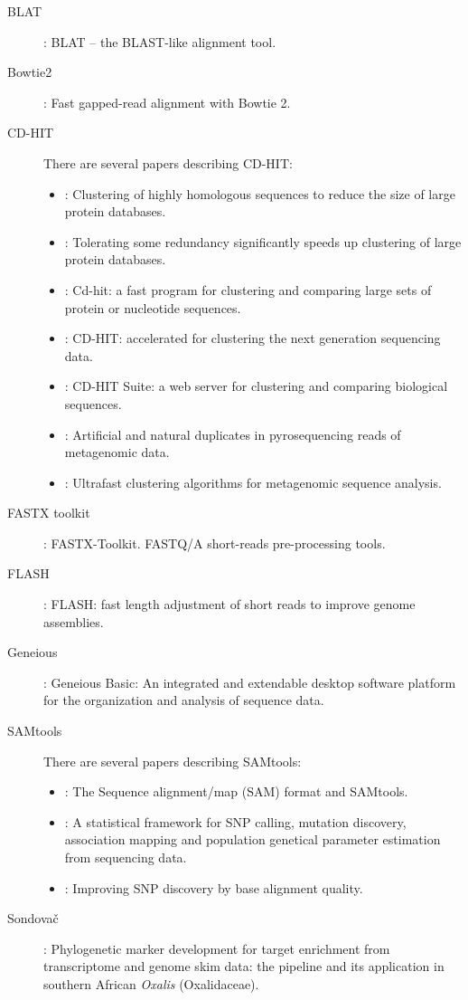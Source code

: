 \documentclass[a4paper, 11pt, twoside]{article}
\begin{document}
\begin{description}
 \item[BLAT] \citet{Kent2002}: BLAT -- the BLAST-like alignment tool.
 \item[Bowtie2] \citet{Langmead2012}: Fast gapped-read alignment with Bowtie 2.
 \item[CD-HIT] There are several papers describing CD-HIT:
  \begin{itemize}
    \item \citet{Li2001}: Clustering of highly homologous sequences to reduce the size of large protein databases.
    \item \citet{Li2002}: Tolerating some redundancy significantly speeds up clustering of large protein databases.
    \item \citet{Li2006}: Cd-hit: a fast program for clustering and comparing large sets of protein or nucleotide sequences.
    \item \citet{Fu2012}: CD-HIT: accelerated for clustering the next generation sequencing data.
    \item \citet{Huang2010}: CD-HIT Suite: a web server for clustering and comparing biological sequences.
    \item \citet{Niu2010}: Artificial and natural duplicates in pyrosequencing reads of metagenomic data.
    \item \citet{Li2012b}: Ultrafast clustering algorithms for metagenomic sequence analysis.
   \end{itemize}
 \item[FASTX toolkit] \citet{Gordon2010}: FASTX-Toolkit. FASTQ/A short-reads pre-processing tools.
 \item[FLASH] \citet{Magoc2011}: FLASH: fast length adjustment of short reads to improve genome assemblies.
 \item[Geneious] \citet{Kearse2012}: Geneious Basic: An integrated and extendable desktop software platform for the organization and analysis of sequence data.
 \item[SAMtools] There are several papers describing SAMtools:
  \begin{itemize}
   \item \citet{Li2009}: The Sequence alignment/map (SAM) format and SAMtools.
   \item \citet{Li2011}: A statistical framework for SNP calling, mutation discovery, association mapping and population genetical parameter estimation from sequencing data.
   \item \citet{Li2011a}: Improving SNP discovery by base alignment quality.
  \end{itemize}
 \item[Sondovač] \citet{Schmickl2016}: Phylogenetic marker development for target enrichment from transcriptome and genome skim data: the pipeline and its application in southern African \textit{Oxalis} (Oxalidaceae).
\end{description}
\end{document}
